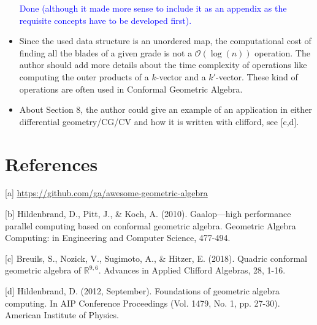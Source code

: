 \documentclass{article}
\begin{document}
\begin{itemize}
\textcolor{blue}{Done (although it made more sense to include it as an
  appendix as the requisite concepts have to be developed first).}
  
\item Since the used data structure is an unordered map, the
  computational cost of finding all the blades of a given grade is not
  a $\mathcal{O}(\log(n))$ operation.  The author should add more
  details about the time complexity of operations like computing the
  outer products of a $k$-vector and a $k'$-vector.  These kind of
  operations are often used in Conformal Geometric Algebra.

\item About Section 8, the author could give an example of an
  application in either differential geometry/CG/CV and how it is
  written with clifford, see [c,d].

\end{itemize}

\section*{References}

\begin{description}
\item{[a]} \url{https://github.com/ga/awesome-geometric-algebra}
\item{[b]} Hildenbrand, D., Pitt, J., \& Koch, A. (2010).
  Gaalop---high performance parallel computing based on conformal
  geometric algebra.  Geometric Algebra Computing: in Engineering and
  Computer Science, 477-494.
\item{[c]} Breuils, S., Nozick, V., Sugimoto, A., \& Hitzer,
  E. (2018).  Quadric conformal geometric algebra of
  $\mathbb{R}^{9,6}$.  Advances in Applied Clifford Algebras, 28,
  1-16.
\item{[d]} Hildenbrand, D. (2012, September).  Foundations of geometric
  algebra computing.  In AIP Conference Proceedings (Vol. 1479, No. 1,
  pp. 27-30).  American Institute of Physics.
\end{description}
\end{document}
